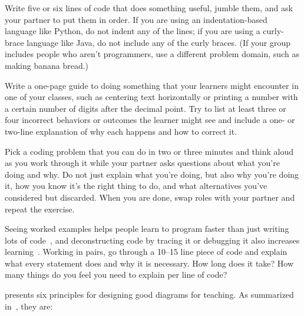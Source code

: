 
Write five or six lines of code that does something useful,
jumble them,
and ask your partner to put them in order.
If you are using an indentation-based language like Python,
do not indent any of the lines;
if you are using a curly-brace language like Java,
do not include any of the curly braces.
(If your group includes people who aren't programmers,
use a different problem domain,
such as making banana bread.)


Write a one-page guide to doing something that your learners might encounter in one of your classes,
such as centering text horizontally
or printing a number with a certain number of digits after the decimal point.
Try to list at least three or four incorrect behaviors or outcomes the learner might see
and include a one- or two-line explanation
of why each happens and how to correct it.


Pick a coding problem that you can do in two or three minutes
and think aloud as you work through it
while your partner asks questions about what you're doing and why.
Do not just explain what you're doing,
but also why you're doing it,
how you know it's the right thing to do,
and what alternatives you've considered but discarded.
When you are done,
swap roles with your partner and repeat the exercise.


Seeing worked examples helps people learn to program faster than just writing lots of code~\cite{Skud2014},
and deconstructing code by tracing it or debugging it also increases learning~\cite{Grif2016}.
Working in pairs,
go through a 10--15 line piece of code and explain what every statement does
and why it is necessary.
How long does it take?
How many things do you feel you need to explain per line of code?


\cite{Maye2009} presents six principles for designing good diagrams for teaching.
As summarized in~\cite{Mill2016a},
they are:

